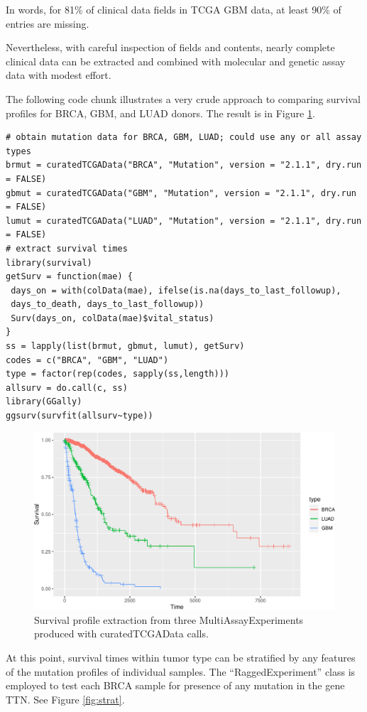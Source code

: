 \documentclass[graybox]{svmult}
\begin{document}
In words, for 81\% of clinical data fields in TCGA GBM data,
at least 90\% of entries are missing.

Nevertheless, with careful inspection of fields and contents,
nearly complete clinical data can be extracted and combined with molecular
and genetic assay data with modest effort.

The following code chunk illustrates a very crude
approach to comparing survival profiles for BRCA, GBM, and LUAD
donors. The result is in Figure \ref{fig:dothesurv}.


{\small
\begin{shaded}
\begin{verbatim}
# obtain mutation data for BRCA, GBM, LUAD; could use any or all assay types
brmut = curatedTCGAData("BRCA", "Mutation", version = "2.1.1", dry.run = FALSE)
gbmut = curatedTCGAData("GBM", "Mutation", version = "2.1.1", dry.run = FALSE)
lumut = curatedTCGAData("LUAD", "Mutation", version = "2.1.1", dry.run = FALSE)
# extract survival times
library(survival)
getSurv = function(mae) {
 days_on = with(colData(mae), ifelse(is.na(days_to_last_followup),
 days_to_death, days_to_last_followup))
 Surv(days_on, colData(mae)$vital_status)
}
ss = lapply(list(brmut, gbmut, lumut), getSurv)
codes = c("BRCA", "GBM", "LUAD")
type = factor(rep(codes, sapply(ss,length)))
allsurv = do.call(c, ss)
library(GGally)
ggsurv(survfit(allsurv~type))
\end{verbatim}
\end{shaded}
}

\begin{figure}
\includegraphics[width=0.8\linewidth,]{bioccb_files/figure-latex/dothesurv-1} \caption{Survival profile extraction from three MultiAssayExperiments produced with curatedTCGAData calls.}\label{fig:dothesurv}
\end{figure}

At this point, survival times within tumor type can be stratified by any
features of the mutation profiles of individual samples.
The ``RaggedExperiment'' class is employed to test each BRCA sample for
presence of any mutation in the gene TTN. See Figure \ref{fig:strat}.
\end{document}
